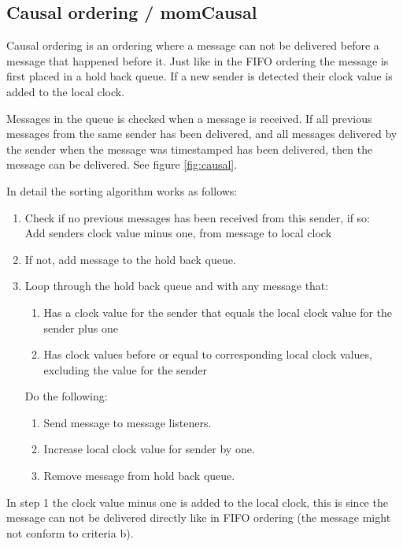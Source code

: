 \documentclass[english]{article}
\begin{document}
\subsection{Causal ordering / momCausal}
\label{mo-causal}
Causal ordering is an ordering where a message can not be delivered before a message that happened before it. Just like in the FIFO ordering the message is first placed in a hold back queue. If a new sender is detected their clock value is added to the local clock.

Messages in the queue is checked when a message is received. If all previous messages from the same sender has been delivered, and all messages delivered by the sender when the message was timestamped has been delivered, then the message can be delivered. See figure \vref{fig:causal}.

In detail the sorting algorithm works as follows:
\begin{enumerate}
\item Check if no previous messages has been received from this sender, if so:\\
	Add senders clock value minus one, from message to local clock
\item If not, add message to the hold back queue.
\item Loop through the hold back queue and with any message that:
	\begin{enumerate}
	\item Has a clock value for the sender that equals the local clock value for the sender plus one
	\item Has clock values before or equal to corresponding local clock values, excluding the value for the sender
	\end{enumerate}
	Do the following:
	\begin{enumerate}
	\item Send message to message listeners.
	\item Increase local clock value for sender by one.
	\item Remove message from hold back queue.
	\end{enumerate}
\end{enumerate}

In step 1 the clock value minus one is added to the local clock, this is since the message can not be delivered directly like in FIFO ordering (the message might not conform to criteria b). 
\end{document}
